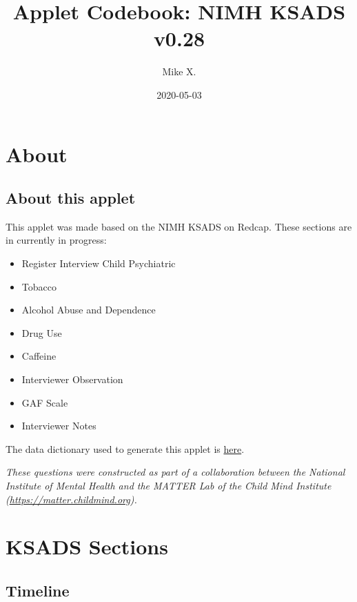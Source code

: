 \documentclass[]{book}
\title{Applet Codebook: NIMH KSADS v0.28}
\author{Mike X.}
\date{2020-05-03}
\providecommand{\tightlist}{%
  \setlength{\itemsep}{0pt}\setlength{\parskip}{0pt}}
\begin{document}
\maketitle

{
\setcounter{tocdepth}{1}
\tableofcontents
}
\hypertarget{part-about}{%
\part{About}\label{part-about}}

\hypertarget{intro}{%
\chapter*{About this applet}\label{intro}}

This applet was made based on the NIMH KSADS on Redcap. These sections are in currently in progress:

\begin{itemize}
\tightlist
\item
  Register Interview Child Psychiatric
\item
  Tobacco
\item
  Alcohol Abuse and Dependence
\item
  Drug Use
\item
  Caffeine
\item
  Interviewer Observation
\item
  GAF Scale
\item
  Interviewer Notes
\end{itemize}

The data dictionary used to generate this applet is \href{https://github.com/hotavocado/KSADS_ML_Applet/blob/master/data_dic.csv}{here}.

\emph{These questions were constructed as part of a collaboration between the National Institute of Mental Health and the MATTER Lab of the Child Mind Institute (\url{https://matter.childmind.org}).}

\hypertarget{part-ksads-sections}{%
\part{KSADS Sections}\label{part-ksads-sections}}

\hypertarget{timeline_section}{%
\chapter{Timeline}\label{timeline_section}}
\end{document}
